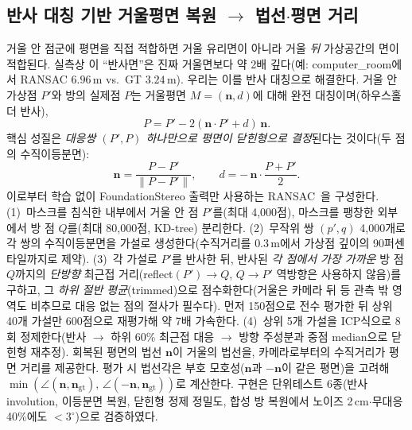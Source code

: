 \documentclass[10pt,a4paper]{article}
\begin{document}
\subsection{반사 대칭 기반 거울평면 복원 $\to$ 법선$\cdot$평면 거리}
\label{sec:sym}
거울 안 점군에 평면을 직접 적합하면 거울 유리면이 아니라 거울 \emph{뒤} 가상공간의 면이 적합된다. 실측상 이 ``반사면''은 진짜 거울면보다 약 2배 깊다(예: computer\_room에서 RANSAC $6.96$\,m vs.\ GT $3.24$\,m). 우리는 이를 반사 대칭으로 해결한다. 거울 안 가상점 $P'$와 방의 실제점 $P$는 거울평면 $M=(\mathbf{n},d)$에 대해 완전 대칭이며(하우스홀더 반사),
\begin{equation}
  P = P' - 2(\mathbf{n}\cdot P' + d)\,\mathbf{n}.
\end{equation}
핵심 성질은 \emph{대응쌍 $(P',P)$ 하나만으로 평면이 닫힌형으로 결정}된다는 것이다(두 점의 수직이등분면):
\begin{equation}
  \mathbf{n} = \frac{P-P'}{\lVert P-P'\rVert},\qquad d = -\,\mathbf{n}\cdot\frac{P+P'}{2}.
\end{equation}
이로부터 학습 없이 FoundationStereo 출력만 사용하는 RANSAC~\cite{ransac1981}을 구성한다. (1)~마스크를 침식한 내부에서 거울 안 점 $P'$를(최대 4{,}000점), 마스크를 팽창한 외부에서 방 점 $Q$를(최대 80{,}000점, KD-tree) 분리한다. (2)~무작위 쌍 $(p',q)$ 4{,}000개로 각 쌍의 수직이등분면을 가설로 생성한다(수직거리를 $0.3$\,m에서 가상점 깊이의 90퍼센타일까지로 제약). (3)~각 가설로 $P'$를 반사한 뒤, 반사된 \emph{각 점에서 가장 가까운} 방 점 $Q$까지의 \emph{단방향} 최근접 거리(reflect$(P')\!\to\!Q$, $Q\!\to\!P'$ 역방향은 사용하지 않음)를 구하고, 그 \emph{하위 절반 평균}(trimmed)으로 점수화한다(거울은 카메라 뒤 등 관측 밖 영역도 비추므로 대응 없는 점의 절사가 필수다). 먼저 150점으로 전수 평가한 뒤 상위 40개 가설만 600점으로 재평가해 약 7배 가속한다. (4)~상위 5개 가설을 ICP식으로 8회 정제한다(반사 $\to$ 하위 60\% 최근접 대응 $\to$ 방향 주성분과 중점 median으로 닫힌형 재추정). 회복된 평면의 법선 $\mathbf{n}$이 거울의 법선을, 카메라로부터의 수직거리가 평면 거리를 제공한다. 평가 시 법선각은 부호 모호성($\mathbf{n}$과 $-\mathbf{n}$이 같은 평면)을 고려해 $\min(\angle(\mathbf{n},\mathbf{n}_{\mathrm{gt}}),\,\angle(-\mathbf{n},\mathbf{n}_{\mathrm{gt}}))$로 계산한다. 구현은 단위테스트 6종(반사 involution, 이등분면 복원, 닫힌형 정제 정밀도, 합성 방 복원에서 노이즈 2\,cm$\cdot$무대응 40\%에도 $<3^\circ$)으로 검증하였다.
\end{document}
